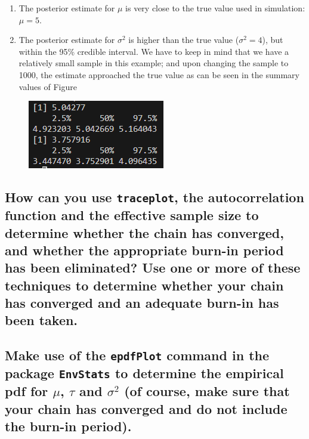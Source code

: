 \documentclass[]{article}
\begin{document}
\begin{enumerate}
	\item The posterior estimate for $\mu$ is very close to the true value used in simulation: $\mu = 5$.

	\item The posterior estimate for $\sigma^2$ is higher than the true value ($\sigma^2 = 4$), but within the 95\% credible interval. We have to keep in mind that we have a relatively small sample in this example; and upon changing the sample to 1000, the estimate approached the true value as can be seen in the summary values of Figure

\end{enumerate}

\begin{figure}[H]
	\centering
	\includegraphics[width=0.7\linewidth]{img/img-2-post-summary1}
	\caption{}
	\label{fig:img-2-post-summary1}
\end{figure}




\subsection{How can you use \texttt{traceplot}, the autocorrelation function and the effective sample size to determine whether the chain has converged, and whether the appropriate burn-in period has been eliminated? Use one or more of these techniques to determine whether your chain has converged and an adequate burn-in has been taken.}	

\subsection{Make use of the \texttt{epdfPlot} command in the package \texttt{EnvStats} to determine the empirical pdf for $\mu$, $\tau$ and $\sigma^2$ (of course, make sure that your chain has converged and do not include the burn-in period).}
\end{document}
